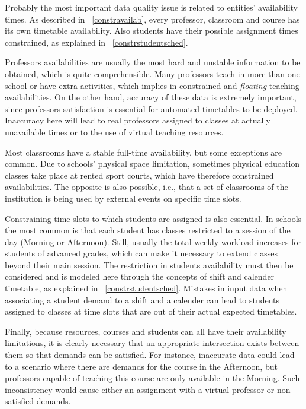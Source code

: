 Probably the most important data quality issue is related to entities' availability times. As described in ~\ref{constravailab}, every professor, classroom and course has its own timetable availability. Also students have their possible assignment times constrained, as explained in ~\ref{constrstudentsched}.

Professors availabilities are usually the most hard and unstable information to be obtained, which is quite comprehensible. Many professors teach in more than one school or have extra activities, which implies in constrained and \textit{floating} teaching availabilities. On the other hand, accuracy of these data is extremely important, since professors satisfaction is essential for automated timetables to be deployed. Inaccuracy here will lead to real professors assigned to classes at actually unavailable times or to the use of virtual teaching resources.

Most classrooms have a stable full-time availability, but some exceptions are common. Due to schools' physical space limitation, sometimes  physical education classes take place at rented sport courts, which have therefore constrained availabilities. The opposite is also possible, i.e., that a set of classrooms of the institution is being used by external events on specific time slots.


Constraining time slots to which students are assigned is also essential. In schools the most common is that each student has classes restricted to a session of the day (Morning or Afternoon). Still, usually the total weekly workload increases for students of advanced grades, which can make it necessary to extend classes beyond their main session. The restriction in students availability must then be considered and is modeled here through the concepts of shift and calender timetable, as explained in ~\ref{constrstudentsched}. Mistakes in input data when associating a student demand to a shift and a calender can lead to students assigned to classes at time slots that are out of their actual expected timetables.

Finally, because resources, courses and students can all have their availability limitations, it is clearly necessary that an appropriate intersection exists between them so that demands can be satisfied. For instance, inaccurate data could lead to a scenario where there are demands for the course  in the Afternoon, but professors capable of teaching this course are only available in the Morning. Such inconsistency would cause either an assignment with a virtual professor or non-satisfied demands.


